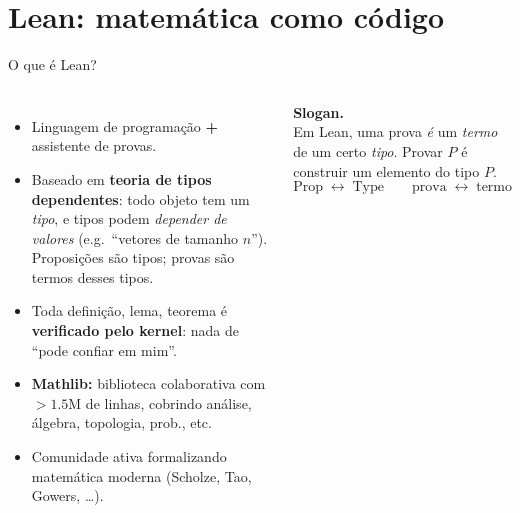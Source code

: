\documentclass[10pt,aspectratio=169]{beamer}
\newcommand{\hl}[1]{{\color{accent}\textbf{#1}}}
\newcommand{\hlb}[1]{{\color{accent2}\textbf{#1}}}
\newcommand{\hlo}[1]{{\color{accent3}\textbf{#1}}}
\newcommand{\hlp}[1]{{\color{accent4}\textbf{#1}}}
\begin{document}
\section{Lean: matemática como código}

\begin{frame}{O que é Lean?}
  \begin{columns}[T,onlytextwidth]
    \begin{itemize}
      \setlength{\itemsep}{0.5em}
      \item Linguagem de programação \hl{+} assistente de provas.
      \pause
      \item Baseado em \hlb{teoria de tipos dependentes}: todo objeto
            tem um \emph{tipo}, e tipos podem \emph{depender de
            valores} (e.g.\ ``vetores de tamanho $n$''). Proposições
            são tipos; provas são termos desses tipos.
      \pause
      \item Toda definição, lema, teorema é \hlo{verificado pelo
            kernel}: nada de ``pode confiar em mim''.
      \pause
      \item \hlp{Mathlib:} biblioteca colaborativa com $>1.5$M de linhas,
            cobrindo análise, álgebra, topologia, prob., etc.
      \pause
      \item Comunidade ativa formalizando
            matemática moderna (Scholze, Tao, Gowers, \ldots).
    \end{itemize}

    \begin{tcolorbox}[colback=bgpanel,colframe=rule,arc=2pt,boxrule=0.4pt,
                       left=6pt,right=6pt,top=4pt,bottom=4pt]
      \scriptsize\color{fgmute}
      \textbf{\color{fgmain}Slogan.}\\[0.3em]
      Em Lean, uma prova \emph{é} um \emph{termo} de um certo \emph{tipo}.
      Provar $P$ é construir um elemento do tipo $P$.\\[0.4em]
      \[\text{Prop} \;\leftrightarrow\; \text{Type} \qquad
        \text{prova} \;\leftrightarrow\; \text{termo}\]
    \end{tcolorbox}
  \end{columns}
\end{frame}
\end{document}

